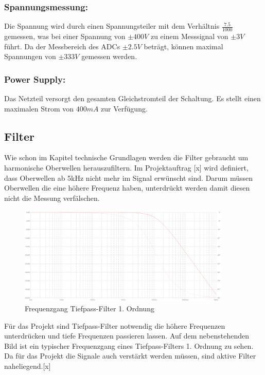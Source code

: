 \subsubsection*{Spannungsmessung:}
Die Spannung wird durch einen Spannungsteiler mit dem Verhältnis $\frac{7.5}{1000}$ gemessen, was bei einer Spannung von $\pm 400V$ zu einem Messsignal von $\pm 3V$ führt. Da der Messbereich des ADCs $\pm 2.5V$ beträgt, können maximal Spannungen von $\pm 333V$ gemessen werden.

\subsubsection*{Power Supply:}
Das Netzteil versorgt den gesamten Gleichstromteil der Schaltung. Es stellt einen maximalen Strom von $400mA$ zur Verfügung.

\subsection{Filter}

Wie schon im Kapitel technische Grundlagen werden die Filter gebraucht um harmonische Oberwellen herauszufiltern. Im Projektauftrag [x] wird definiert, dass Oberwellen ab 5kHz nicht mehr im Signal erwünscht sind. Darum müssen Oberwellen die eine höhere Frequenz haben, unterdrückt werden damit diesen nicht die Messung verfälschen.

\begin{minipage}[h]{0.5\textwidth} 
\begin{figure}[H]
\begin{center}
\includegraphics[width=0.9\textwidth]{images/Analoge_Schaltung_Frequenzgang.png}
\caption{Frequenzgang Tiefpass-Filter 1. Ordnung}
\end{center}
\end{figure}
\end{minipage}
\begin{minipage}[h]{0.5\textwidth}
Für das Projekt sind Tiefpass-Filter notwendig die höhere Frequenzen unterdrücken und tiefe Frequenzen passieren lassen. Auf dem nebenstehenden Bild ist ein typischer Frequenzgang eines Tiefpass-Filters 1. Ordnung zu sehen. Da für das Projekt die Signale auch verstärkt werden müssen, sind aktive Filter naheliegend.[x]
\end{minipage}


